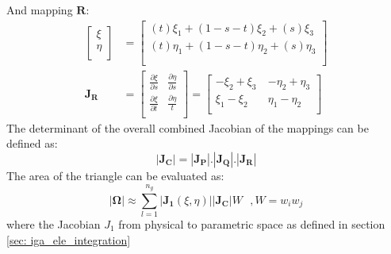 \documentclass[12pt, a4paper]{report}
\begin{document}
And mapping $\boldsymbol{R}$:
\begin{align}
  \begin{bmatrix}
    \xi \\
    \eta \\
  \end{bmatrix}
  &=
  \begin{bmatrix}
    (t)\xi_1 + (1-s-t)\xi_2 + (s)\xi_3 \\
    (t)\eta_1 + (1-s-t)\eta_2 + (s)\eta_3 \\ \\
  \end{bmatrix} \\
  \boldsymbol{J_R} &=
  \begin{bmatrix}
    \frac{\partial \xi}{\partial s} & \frac{\partial \eta}{\partial s} \\
    \frac{\partial \xi}{\partial t} & \frac{\partial \eta}{t} \\
  \end{bmatrix} =
  \begin{bmatrix}
    -\xi_2+\xi_3\ & -\eta_2+\eta_3 \\
    \xi_1-\xi_2\ & \eta_1-\eta_2 \\
  \end{bmatrix}
\end{align}
The determinant of the overall combined Jacobian of the mappings can be defined as:
\begin{equation}
    |\boldsymbol{J_C}|= |\boldsymbol{J_P}|.|\boldsymbol{J_Q}|.|\boldsymbol{J_R}|
\end{equation}
The area of the triangle can be evaluated as:
\begin{equation}
  \left| \boldsymbol{\Omega} \right| \approx \sum_{l=1}^{n_g} \left| \boldsymbol{J_1}(\xi, \eta) \right| \left| \boldsymbol{J_{C}} \right|W~~~,W=w_iw_j
\end{equation}
where the Jacobian $J_1$ from physical to parametric space as defined in section \ref{sec: iga_ele_integration}
\end{document}
